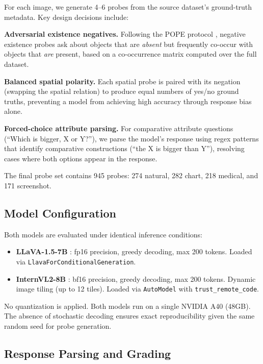 \documentclass[conference]{IEEEtran}
\begin{document}
For each image, we generate 4--6 probes from the source dataset's ground-truth metadata. Key design decisions include:

\textbf{Adversarial existence negatives.} Following the POPE protocol \cite{li2023pope}, negative existence probes ask about objects that are \textit{absent} but frequently co-occur with objects that \textit{are} present, based on a co-occurrence matrix computed over the full dataset.

\textbf{Balanced spatial polarity.} Each spatial probe is paired with its negation (swapping the spatial relation) to produce equal numbers of yes/no ground truths, preventing a model from achieving high accuracy through response bias alone.

\textbf{Forced-choice attribute parsing.} For comparative attribute questions (``Which is bigger, X or Y?''), we parse the model's response using regex patterns that identify comparative constructions (``the X is bigger than Y''), resolving cases where both options appear in the response.

The final probe set contains 945 probes: 274 natural, 282 chart, 218 medical, and 171 screenshot.

\subsection{Model Configuration}

Both models are evaluated under identical inference conditions:

\begin{itemize}
\item \textbf{LLaVA-1.5-7B} \cite{liu2023llava15}: fp16 precision, greedy decoding, max 200 tokens. Loaded via \texttt{LlavaForConditionalGeneration}.
\item \textbf{InternVL2-8B} \cite{chen2024internvl}: bf16 precision, greedy decoding, max 200 tokens. Dynamic image tiling (up to 12 tiles). Loaded via \texttt{AutoModel} with \texttt{trust\_remote\_code}.
\end{itemize}

No quantization is applied. Both models run on a single NVIDIA A40 (48GB). The absence of stochastic decoding ensures exact reproducibility given the same random seed for probe generation.

\subsection{Response Parsing and Grading}
\end{document}
